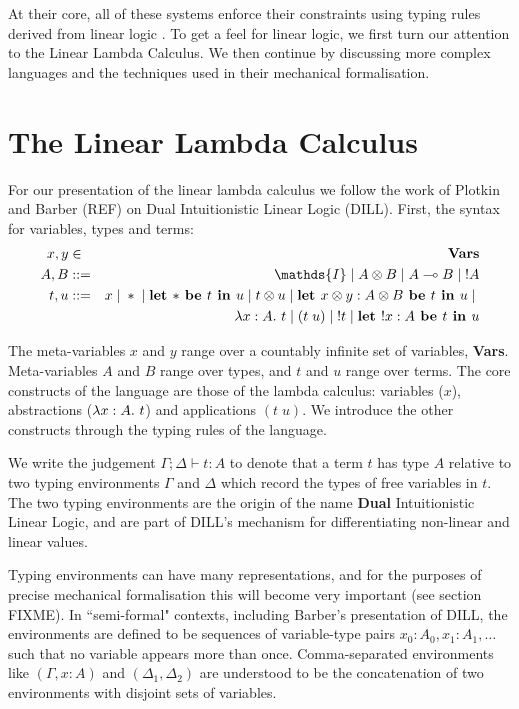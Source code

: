 \documentclass[]{unswthesis}
\newcommand{\lam}[1]{\lambda #1 \ldotp \,}
\newcommand{\app}[2]{(#1 \; #2)}
\newcommand{\lolly}{\multimap}
\newcommand{\types}{\vdash}
\newcommand{\letbe}[3]{\textbf{let $#1$ be $#2$ in $#3$}}
\newcommand{\sor}{\; | \;}
\let\b\textbf
\begin{document}
At their core, all of these systems enforce their constraints using typing rules derived from linear logic \cite{girard87}. To get a feel for linear logic, we first turn our attention to the Linear Lambda Calculus. We then continue by discussing more complex languages and the techniques used in their mechanical formalisation.

\section{The Linear Lambda Calculus}

For our presentation of the linear lambda calculus we follow the work of Plotkin and Barber (REF) on Dual Intuitionistic Linear Logic (DILL). First, the syntax for variables, types and terms:
\begin{eqnarray*}
x,y & \in & \b{Vars} \\
A, B & ::= & \mathds{I} \sor A \otimes B \sor A \lolly B \sor {!A} \\
t, u & ::= & x \sor * \sor \letbe{*}{t}{u} \sor t \otimes u \sor \letbe{x \otimes y : A \otimes B}{t}{u} \sor \\
  &     & \lam{x : A} t \sor \app{t}{u} \sor {!t} \sor \letbe{!x : A}{t}{u}
\end{eqnarray*}

The meta-variables $x$ and $y$ range over a countably infinite set of variables, \b{Vars}. Meta-variables $A$ and $B$ range over types, and $t$ and $u$ range over terms. The core constructs of the language are those of the lambda calculus: variables ($x$), abstractions ($\lam{x : A} t$) and applications $\app{t}{u}$. We introduce the other constructs through the typing rules of the language.

We write the judgement $\Gamma; \Delta \types t : A$ to denote that a term $t$ has type $A$ relative to two typing environments $\Gamma$ and $\Delta$ which record the types of free variables in $t$. The two typing environments are the origin of the name \b{Dual} Intuitionistic Linear Logic, and are part of DILL's mechanism for differentiating non-linear and linear values.

Typing environments can have many representations, and for the purposes of precise mechanical formalisation this will become very important (see section FIXME). In ``semi-formal" contexts, including Barber's presentation of DILL, the environments are defined to be sequences of variable-type pairs $x_0 : A_0, x_1 : A_1, \dots$ such that no variable appears more than once. Comma-separated environments like $(\Gamma, x : A)$ and $(\Delta_1, \Delta_2)$ are understood to be the concatenation of two environments with disjoint sets of variables.
\end{document}

